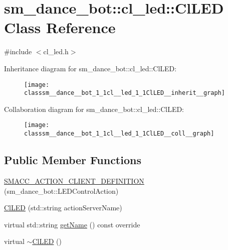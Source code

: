 \hypertarget{classsm__dance__bot_1_1cl__led_1_1ClLED}{}\section{sm\+\_\+dance\+\_\+bot\+:\+:cl\+\_\+led\+:\+:Cl\+L\+ED Class Reference}
\label{classsm__dance__bot_1_1cl__led_1_1ClLED}


{\ttfamily \#include $<$cl\+\_\+led.\+h$>$}



Inheritance diagram for sm\+\_\+dance\+\_\+bot\+:\+:cl\+\_\+led\+:\+:Cl\+L\+ED\+:
\nopagebreak
\begin{figure}[H]
\begin{center}
\leavevmode
\texttt{[image: classsm\_\_dance\_\_bot\_1\_1cl\_\_led\_1\_1ClLED\_\_inherit\_\_graph]}
\end{center}
\end{figure}


Collaboration diagram for sm\+\_\+dance\+\_\+bot\+:\+:cl\+\_\+led\+:\+:Cl\+L\+ED\+:
\nopagebreak
\begin{figure}[H]
\begin{center}
\leavevmode
\texttt{[image: classsm\_\_dance\_\_bot\_1\_1cl\_\_led\_1\_1ClLED\_\_coll\_\_graph]}
\end{center}
\end{figure}
\subsection*{Public Member Functions}
\begin{DoxyCompactItemize}
\item 
\hyperlink{classsm__dance__bot_1_1cl__led_1_1ClLED_ab147c1770ddc2fad333427ae9f909011}{S\+M\+A\+C\+C\+\_\+\+A\+C\+T\+I\+O\+N\+\_\+\+C\+L\+I\+E\+N\+T\+\_\+\+D\+E\+F\+I\+N\+I\+T\+I\+ON} (sm\+\_\+dance\+\_\+bot\+::\+L\+E\+D\+Control\+Action)
\item 
\hyperlink{classsm__dance__bot_1_1cl__led_1_1ClLED_a5ef372c6230f1a3eb2dcd85f715b60b0}{Cl\+L\+ED} (std\+::string action\+Server\+Name)
\item 
virtual std\+::string \hyperlink{classsm__dance__bot_1_1cl__led_1_1ClLED_aa0a9fb92df96fb1bbba35c78fbe4119d}{get\+Name} () const override
\item 
virtual \hyperlink{classsm__dance__bot_1_1cl__led_1_1ClLED_add9ff40d28e1d31d77e1a2ff92e79fd2}{$\sim$\+Cl\+L\+ED} ()
\end{DoxyCompactItemize}
